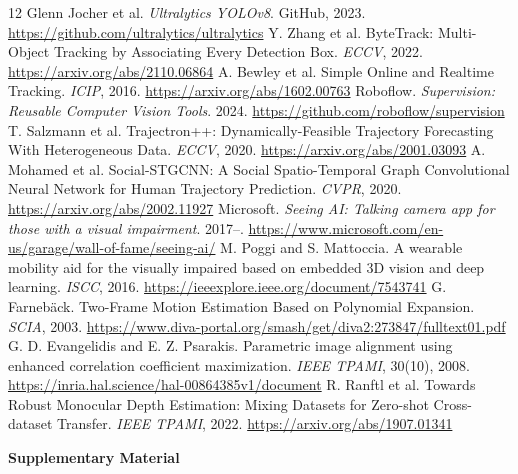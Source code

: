\documentclass[10pt,twocolumn,letterpaper]{article}
\begin{document}
\begingroup
\footnotesize
\begin{thebibliography}{12}
\setlength{\itemsep}{1pt plus 0.3ex}
 Glenn Jocher et al.
  \textit{Ultralytics YOLOv8}. GitHub, 2023.
  \url{https://github.com/ultralytics/ultralytics}
 Y. Zhang et al.
  ByteTrack: Multi-Object Tracking by Associating Every Detection Box.
  \textit{ECCV}, 2022. \url{https://arxiv.org/abs/2110.06864}
 A. Bewley et al.
  Simple Online and Realtime Tracking. \textit{ICIP}, 2016.
  \url{https://arxiv.org/abs/1602.00763}
 Roboflow.
  \textit{Supervision: Reusable Computer Vision Tools}. 2024.
  \url{https://github.com/roboflow/supervision}
 T. Salzmann et al.
  Trajectron++: Dynamically-Feasible Trajectory Forecasting With
  Heterogeneous Data. \textit{ECCV}, 2020.
  \url{https://arxiv.org/abs/2001.03093}
 A. Mohamed et al.
  Social-STGCNN: A Social Spatio-Temporal Graph Convolutional Neural
  Network for Human Trajectory Prediction. \textit{CVPR}, 2020.
  \url{https://arxiv.org/abs/2002.11927}
 Microsoft. \textit{Seeing AI: Talking camera app
  for those with a visual impairment}. 2017--.
  \url{https://www.microsoft.com/en-us/garage/wall-of-fame/seeing-ai/}
 M. Poggi and S. Mattoccia.
  A wearable mobility aid for the visually impaired based on
  embedded 3D vision and deep learning. \textit{ISCC}, 2016.
  \url{https://ieeexplore.ieee.org/document/7543741}
 G. Farneb\"ack.
  Two-Frame Motion Estimation Based on Polynomial Expansion.
  \textit{SCIA}, 2003.
  \url{https://www.diva-portal.org/smash/get/diva2:273847/fulltext01.pdf}
 G. D. Evangelidis and E. Z. Psarakis.
  Parametric image alignment using enhanced correlation
  coefficient maximization. \textit{IEEE TPAMI}, 30(10), 2008.
  \url{https://inria.hal.science/hal-00864385v1/document}
 R. Ranftl et al.
  Towards Robust Monocular Depth Estimation: Mixing Datasets for
  Zero-shot Cross-dataset Transfer. \textit{IEEE TPAMI}, 2022.
  \url{https://arxiv.org/abs/1907.01341}
\end{thebibliography}
\endgroup

\clearpage
\appendix

\begin{center}
{\large\bfseries Supplementary Material}
\end{center}
\end{document}
